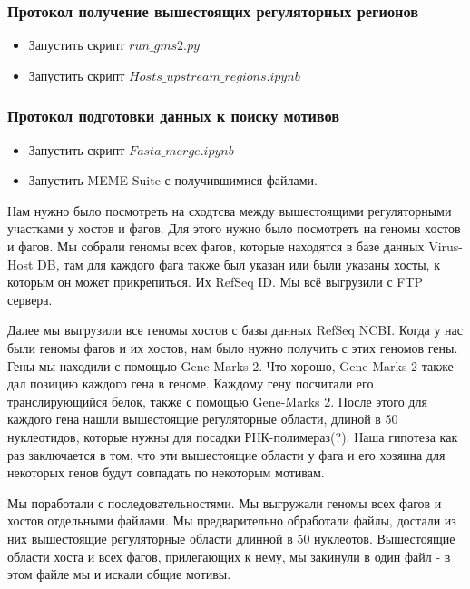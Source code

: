 \documentclass[a4paper,12pt]{article}
\begin{document}
    \subsubsection{Протокол получение вышестоящих регуляторных регионов}
        \begin{itemize}
            \item Запустить скрипт \(run\_gms2.py\)
            \item Запустить скрипт \(Hosts\_upstream\_regions.ipynb\)
        \end{itemize}
    \subsubsection{Протокол подготовки данных к поиску мотивов}
        \begin{itemize}
            \item Запустить скрипт \(Fasta\_merge.ipynb\)
            \item Запустить MEME Suite с получившимися файлами.
        \end{itemize}

\par{Нам нужно было посмотреть на сходтсва между вышестоящими регуляторными участками у хостов и фагов. Для этого нужно
было посмотреть на геномы хостов и фагов. Мы собрали геномы всех фагов, которые находятся в базе данных Virus-Host DB,
там для каждого фага также был указан или были указаны хосты, к которым он может прикрепиться. Их RefSeq ID. Мы всё
выгрузили с FTP сервера.}

\par{Далее мы выгрузили все геномы хостов с базы данных RefSeq NCBI. Когда у нас были геномы фагов и их хостов, нам было
нужно получить с этих геномов гены. Гены мы находили с помощью Gene-Marks 2. Что хорошо, Gene-Marks 2 также дал позицию
каждого гена в геноме. Каждому гену посчитали его транслирующийся белок, также с помощью Gene-Marks 2. После этого для
каждого гена нашли вышестоящие регуляторные области, длиной в 50 нуклеотидов, которые нужны для посадки РНК-полимераз(?).
Наша гипотеза как раз заключается в том, что эти вышестоящие области у фага и его хозяина для некоторых генов будут
совпадать по некоторым мотивам.}

\par{Мы поработали с последовательностями. Мы выгружали геномы всех фагов и хостов отдельными файлами. Мы предварительно
обработали файлы, достали из них вышестоящие регуляторные области длинной в 50 нуклеотов. Вышестоящие области хоста и
всех фагов, прилегающих к нему, мы закинули в один файл - в этом файле мы и искали общие мотивы.}
\end{document}
